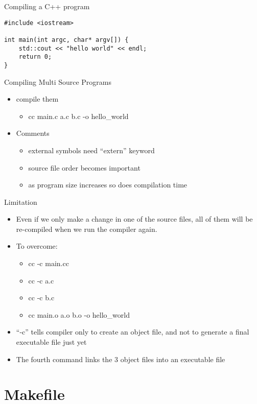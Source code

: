 \documentclass{beamer}
\begin{document}
\begin{frame}[fragile]{Compiling a C++ program}
\begin{lstlisting}
#include <iostream> 

int main(int argc, char* argv[]) {
    std::cout << "hello world" << endl; 
    return 0; 
}
\end{lstlisting}
\end{frame}

\begin{frame}{Compiling Multi Source Programs}
\begin{itemize}
\item compile them
\begin{itemize}
\item cc main.c a.c b.c -o hello\_world
\end{itemize}
\item Comments
\begin{itemize}
\item external symbols need ``extern'' keyword
\item source file order becomes important
\item as program size increases so does compilation time
\end{itemize}
\end{itemize}
\end{frame}

\begin{frame}{Limitation}
\begin{itemize}
\item Even if we only make a change in one of the source files, all of them will be re-compiled when we run the compiler again.
\item To overcome:
\begin{itemize}
\item cc -c main.cc 
\item cc -c a.c 
\item cc -c b.c 
\item cc main.o a.o b.o -o hello\_world 
\end{itemize}
\item ``-c'' tells compiler only to create an object file, and not to generate a final executable file just yet
\item The fourth command links the 3 object files into an executable file
\end{itemize}
\end{frame}

\section{Makefile}
\end{document}
